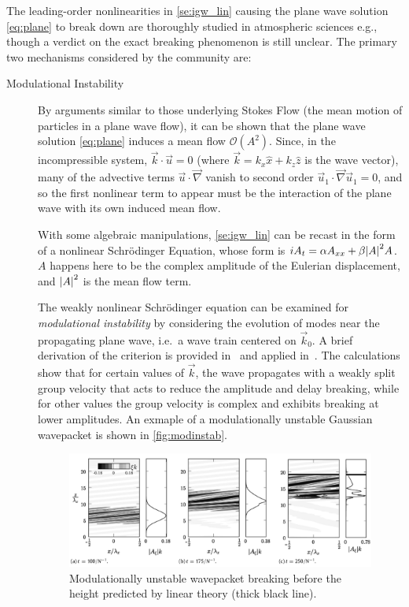 \documentclass[11pt,
        usenames, %
        dvipsnames %
    ]{article}
\DeclarePairedDelimiter\abs{\lvert}{\rvert}
\begin{document}
The leading-order nonlinearities in \autoref{se:igw_lin} causing the plane wave
solution \autoref{eq:plane} to break down are thoroughly studied in atmospheric
sciences e.g.\cite{Sutherland1}\cite{Sutherland2}, though a verdict on the exact
breaking phenomenon is still unclear. The primary two mechanisms considered by
the community are:
\begin{description}
    \item[Modulational Instability] By arguments similar to those underlying
        Stokes Flow (the mean motion of particles in a plane wave flow), it can
        be shown that the plane wave solution \autoref{eq:plane} induces a mean
        flow $\mathcal{O}(A^2)$. Since, in the incompressible system, $\vec{k}
        \cdot \vec{u} = 0$ (where $\vec{k} = k_x\hat{x} + k_z\hat{z}$ is the
        wave vector), many of the advective terms $\vec{u} \cdot \vec{\nabla}$
        vanish to second order $\vec{u}_1 \cdot \vec{\nabla}\vec{u}_1 = 0$, and
        so the first nonlinear term to appear must be the interaction of the
        plane wave with its own induced mean flow.

        With some algebraic manipulations, \autoref{se:igw_lin} can be recast in
        the form of a nonlinear Schr\"odinger Equation, whose form is $iA_t =
        \alpha A_{xx} + \beta \abs*{A}^2A$. $A$ happens here to be the complex
        amplitude of the Eulerian displacement, and $\abs*{A}^2$ is the mean
        flow term.

        The weakly nonlinear Schr\"odinger equation can be examined for
        \emph{modulational instability} by considering the evolution of modes
        near the propagating plane wave, i.e.\ a wave train centered on
        $\vec{k}_0$. A brief derivation of the criterion is provided
        in~\cite{Whitham} and applied in~\cite{Sutherland1}. The calculations
        show that for certain values of $\vec{k}$, the wave propagates with a
        weakly split group velocity that acts to reduce the amplitude and delay
        breaking, while for other values the group velocity is complex and
        exhibits breaking at lower amplitudes. An exmaple of a modulationally
        unstable Gaussian wavepacket is shown in \autoref{fig:modinstab}.
        \begin{figure}[t]
            \centering
            \includegraphics[width=\textwidth]{figs/sutherland_modinstab.png}
            \caption{Modulationally unstable wavepacket breaking before the
            height predicted by linear theory (thick black
            line).}\label{fig:modinstab}
        \end{figure}


\end{description}
\end{document}

